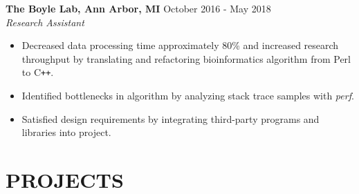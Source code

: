 \documentclass[overlapped]{res}
\begin{document}
\begin{resume}
\begin{itemize}
\end{itemize}

\textbf{The Boyle Lab, Ann Arbor, MI}
\hfill October 2016 - May 2018 \\
{\sl Research Assistant}
    \begin{itemize}  \itemsep -2pt %
    \item Decreased data processing time approximately 80\% 
    and increased research throughput
    by translating and refactoring bioinformatics algorithm 
    from Perl to C\texttt{++}.
    
    \item Identified bottlenecks in algorithm by analyzing stack trace samples with \textit{perf}.
    
    \item Satisfied design requirements by integrating third-party programs 
    and libraries into project.
    

\end{itemize}

\section{PROJECTS}


\end{resume}
\end{document}
